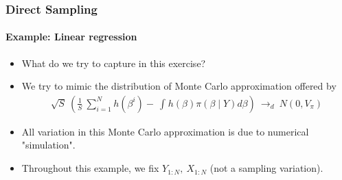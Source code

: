 \documentclass[
  shownotes,
  xcolor={svgnames},
  hyperref={colorlinks,citecolor=DarkBlue,linkcolor=DarkRed,urlcolor=DarkBlue}
  , aspectratio=169]{beamer}
\begin{document}
\begin{frame}[fragile]
\frametitle{Direct Sampling} 
\framesubtitle{Example: Linear regression}

\begin{itemize}

\item What do we try to capture in this exercise?
\medskip
\item We try to mimic the distribution of Monte Carlo approximation offered by
\medskip
\begin{align}
\sqrt{S}\ \left( \frac{1}{S}\ \sum_{i = 1}^{N}{h\left( \beta^{i} \right) - \ \int_{}^{}{h\left( \beta \right)\pi\left( \beta \middle| Y \right) d\beta}} \right)\  \rightarrow_{d}\ N(0,V_{\pi})
\end{align}
\medskip
\item All variation in this Monte Carlo approximation is due to numerical "simulation".
\medskip
\item Throughout this example, we fix $Y_{1:N},\ X_{1:N}$ (not a sampling variation).
\end{itemize}
\end{frame}

\end{document}
